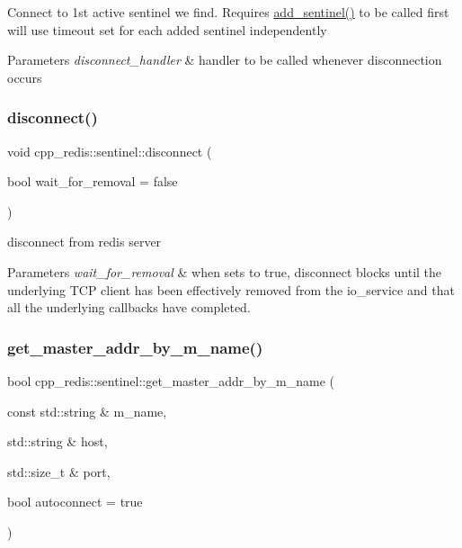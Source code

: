 Connect to 1st active sentinel we find. Requires \mbox{\hyperlink{classcpp__redis_1_1sentinel_a6c846b71478c330d2cad7aa662dfd681}{add\+\_\+sentinel()}} to be called first will use timeout set for each added sentinel independently


\begin{DoxyParams}{Parameters}
{\em disconnect\+\_\+handler} & handler to be called whenever disconnection occurs \\
\hline
\end{DoxyParams}
\mbox{\label{classcpp__redis_1_1sentinel_af607d8c5a20ada35daad251f1b1b2f68}} 
\subsubsection{\texorpdfstring{disconnect()}{disconnect()}}
{\footnotesize\ttfamily void cpp\+\_\+redis\+::sentinel\+::disconnect (\begin{DoxyParamCaption}\item[{bool}]{wait\+\_\+for\+\_\+removal = {\ttfamily false} }\end{DoxyParamCaption})}

disconnect from redis server


\begin{DoxyParams}{Parameters}
{\em wait\+\_\+for\+\_\+removal} & when sets to true, disconnect blocks until the underlying T\+CP client has been effectively removed from the io\+\_\+service and that all the underlying callbacks have completed. \\
\hline
\end{DoxyParams}
\mbox{\label{classcpp__redis_1_1sentinel_a2886493b40b00dfafdd3b22dfe28e0c3}} 
\subsubsection{\texorpdfstring{get\+\_\+master\+\_\+addr\+\_\+by\+\_\+m_name()}{get\_master\_addr\_by\_name()}}
{\footnotesize\ttfamily bool cpp\+\_\+redis\+::sentinel\+::get\+\_\+master\+\_\+addr\+\_\+by\+\_\+m_name (\begin{DoxyParamCaption}\item[{const std\+::string \&}]{m_name,  }\item[{std\+::string \&}]{host,  }\item[{std\+::size\+\_\+t \&}]{port,  }\item[{bool}]{autoconnect = {\ttfamily true} }\end{DoxyParamCaption})}

